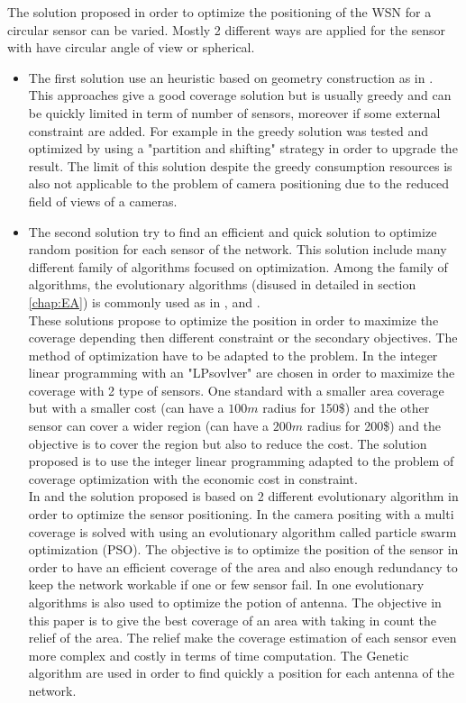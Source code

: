 The solution proposed in order to optimize the positioning of the WSN for a circular sensor can be varied. Mostly 2 different ways are applied for the sensor with have circular angle of view or spherical.\\

\begin{itemize}



\item	The first solution use an heuristic based on geometry construction as in \cite{175*medhi2013}. This approaches give a good coverage solution but is usually greedy and can be quickly limited in term of number of sensors, moreover if some external constraint are added.  For example in \cite{174*zhang2016} the greedy solution was tested and optimized by using a "partition and shifting" strategy in order to upgrade the result.
The limit of this solution despite the greedy consumption resources is also not applicable to the problem of camera positioning due to the reduced field of views of a cameras.  \\
\item	The second solution try to find an efficient and quick solution to optimize  random position for each sensor of the network.  
This solution include many different family of algorithms focused on optimization.
Among the family of algorithms,  the evolutionary algorithms (disused in detailed in section  \ref{chap:EA}) is commonly used as in \cite{200*kulkarni2011,59*wang2008}, and \cite{150*chakrabarty2002}. \\
These solutions  propose to optimize the position in order to maximize the coverage depending then different constraint or the secondary objectives. The method of optimization have to be adapted to the problem. 
In  \cite{150*chakrabarty2002} the integer linear programming with an "LPsovlver" are chosen in order to maximize the coverage with 2 type of sensors. One standard with a smaller area coverage but with a smaller cost (can have a $100m$ radius for 150\$) and the other sensor can cover a wider region (can have a $200m$  radius for 200\$) and the objective is to cover the region but also to reduce the cost. The solution proposed is to use the integer linear programming adapted to the problem of coverage optimization with the economic cost in constraint. \\
In \cite{59*wang2008} and \cite{200*kulkarni2011} the solution proposed is based on 2 different evolutionary algorithm in order to optimize the sensor positioning. In \cite{200*kulkarni2011} the camera positing with a multi coverage is solved with using an evolutionary algorithm called particle swarm optimization (PSO). The objective is to optimize the position of the sensor in order to have an efficient coverage of the area and also enough redundancy to keep the network workable if one or few sensor fail. In \cite{59*wang2008} one evolutionary algorithms is also used to optimize the potion of antenna. The objective in this paper is to give the best coverage of an area with taking in count the relief of the area. The relief make the coverage estimation of each sensor even more complex and costly in terms of time computation. The Genetic algorithm are used in order to find quickly a position for each antenna of the network. 

\end{itemize}
